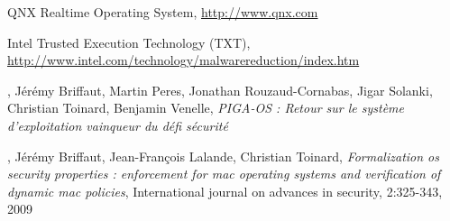 \documentclass[pdftex,a4paper,titlepage,11pt]{article}
\begin{document}
\begin{thebibliography}{40}
 QNX Realtime Operating System, \url{http://www.qnx.com}

 Intel Trusted Execution Technology (TXT), \url{http://www.intel.com/technology/malwarereduction/index.htm}

, Jérémy Briffaut, Martin Peres, Jonathan Rouzaud-Cornabas, Jigar Solanki, Christian Toinard, Benjamin Venelle, \textit{PIGA-OS : Retour sur le système d'exploitation vainqueur du défi sécurité}

, Jérémy Briffaut, Jean-François Lalande, Christian Toinard, \textit{Formalization os security properties : enforcement for mac operating systems and verification of dynamic mac policies}, International journal on advances in security, 2:325-343, 2009

\end{thebibliography}

\end{document}
